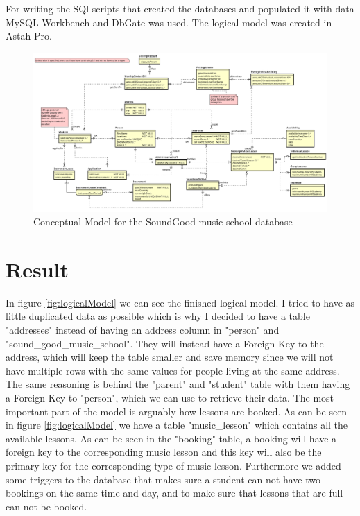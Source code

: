 \documentclass[a4paper]{scrreprt}
\begin{document}
For writing the SQl scripts that created the databases and populated it with data MySQL Workbench and DbGate was used. The logical model was created in Astah Pro. 

\begin{figure}[h]
    \begin{center}
        \includegraphics[width=\textwidth]{../img/conceptualModel.v1.0.1.png}
        \caption{Conceptual Model for the SoundGood music school database}
        \label{fig:conceptualModel}
    \end{center}
\end{figure} 

\chapter{Result}

\label{sec:result}
In figure \ref{fig:logicalModel} we can see the finished logical model. 
I tried to have as little duplicated data as possible which is why I decided to have a table "addresses" instead of having an address column in "person" and 
"sound\_good\_music\_school". They will instead have a Foreign Key to the address, which will keep the table smaller and save memory since we will not have multiple
rows with the same values for people living at the same address. The same reasoning is behind the "parent" and "student" table with them having a Foreign Key to "person", which we can use to retrieve their 
data. 
The most important part of the model is arguably how lessons are booked. As can be seen in figure \ref{fig:logicalModel} we have a table "music\_lesson" which contains all the available lessons. As can be seen 
in the "booking" table, a booking will have a foreign key to the corresponding music lesson and this key will also be the primary key for the corresponding type of music lesson. Furthermore we added some triggers
to the database that makes sure a student can not have two bookings on the same time and day, and to make sure that lessons that are full can not be booked.
\end{document}
